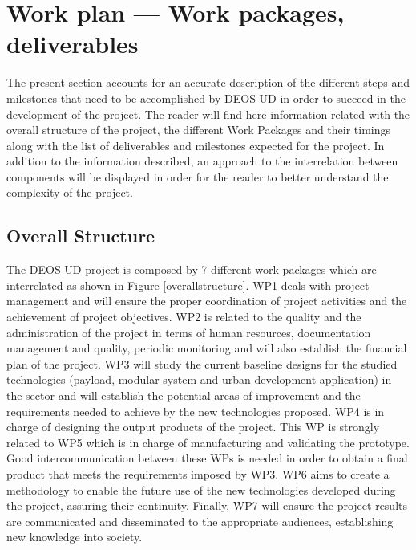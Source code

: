 \section{Work plan — Work packages, deliverables}

The present section accounts for an accurate description of the different steps and milestones that need to be accomplished by DEOS-UD in order to succeed in the development of the project. The reader will find here information related with the overall structure of the project, the different Work Packages and their timings along with the list of deliverables and milestones expected for the project. In addition to the information described, an approach to the interrelation between components will be displayed in order for the reader to better understand the complexity of the project.  

\subsection{Overall Structure}

The DEOS-UD project is composed by 7 different work packages which are interrelated as shown in Figure \ref{overallstructure}. WP1 deals with project management and will ensure the proper coordination of project activities and the achievement of project objectives. WP2 is related to the quality and the administration of the project in terms of human resources, documentation management and quality, periodic monitoring and will also establish the financial plan of the project. WP3 will study the current baseline designs for the studied technologies (payload, modular system and urban development application) in the sector and will establish the potential areas of improvement and the requirements needed to achieve by the new technologies proposed. WP4 is in charge of designing the output products of the project. This WP is strongly related to WP5 which is in charge of manufacturing and validating the prototype. Good intercommunication between these WPs is needed in order to obtain a final product that meets the requirements imposed by WP3. WP6 aims to create a methodology to enable the future use of the new technologies developed during the project, assuring their continuity. Finally, WP7 will ensure the project results are communicated and disseminated to the appropriate audiences, establishing new knowledge into society. 

